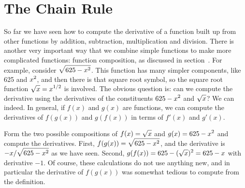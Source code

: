 \section{The Chain Rule}{}{}

So far we have seen how to compute the derivative of a function built
up from other functions by addition, subtraction, multiplication and
division. There is another very important way that we combine simple
functions to make more complicated functions: function
composition, as discussed in
section~. For example, consider $\displaystyle
\sqrt{625-x^2}$. This function has many simpler components, like 625
and $\displaystyle x^2$, and then there is that square root symbol, so the
square root function $\displaystyle \sqrt{x}=x^{1/2}$ is involved. The obvious
question is: can we compute the derivative using the derivatives of
the constituents $\displaystyle 625-x^2$ and $\displaystyle \sqrt{x}$? We can indeed. In
general, if $f(x)$ and $g(x)$ are functions, we can compute the
derivatives of $f(g(x))$ and $g(f(x))$ in terms of $f'(x)$ and
$g'(x)$. 

\example Form the two possible compositions of $\displaystyle f(x)=\sqrt{x}$ and
$\displaystyle g(x)=625-x^2$ and compute the derivatives.  First, $\displaystyle
f(g(x))=\sqrt{625-x^2}$, and the derivative is $\displaystyle -x/\sqrt{625-x^2}$
as we have seen. Second, $\displaystyle g(f(x))=625-(\sqrt{x})^2=625-x$ with
derivative $-1$. Of course, these calculations do not use anything
new, and in particular the derivative of $f(g(x))$ was somewhat
tedious to compute from the definition.
\endexample

